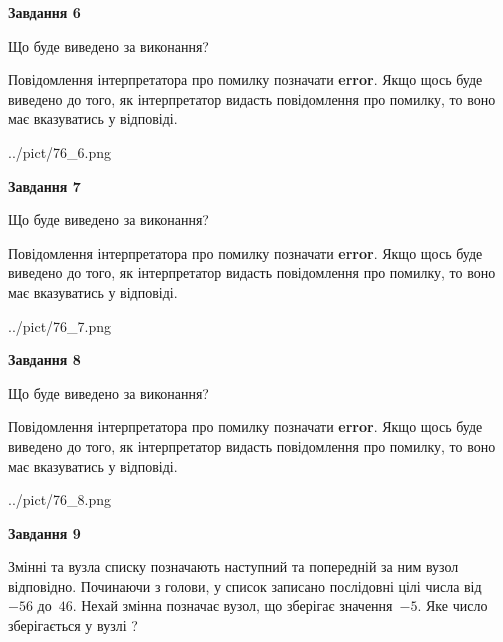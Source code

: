 \documentclass[12pt, ukrainian]{article}
\begin{document}
{\begin {large}
{\begin {center}\textbf{Завдання 6}\end {center}}\par
Що буде виведено за виконання?

Повідомлення інтерпретатора про помилку позначати \textbf{error}.
Якщо щось буде виведено до того, як інтерпретатор видасть повідомлення про помилку, 
то воно має вказуватись у відповіді. \par


\begin{center}
	{../pict/76_6.png}
\end{center}
\newpage

{\begin {center}\textbf{Завдання 7}\end {center}}\par
Що буде виведено за виконання?

Повідомлення інтерпретатора про помилку позначати \textbf{error}.
Якщо щось буде виведено до того, як інтерпретатор видасть повідомлення про помилку, 
то воно має вказуватись у відповіді. \par


\begin{center}
	{../pict/76_7.png}
\end{center}
\newpage

{\begin {center}\textbf{Завдання 8}\end {center}}\par
Що буде виведено за виконання?

Повідомлення інтерпретатора про помилку позначати \textbf{error}.
Якщо щось буде виведено до того, як інтерпретатор видасть повідомлення про помилку, 
то воно має вказуватись у відповіді. \par


\begin{center}
	{../pict/76_8.png}
\end{center}
\newpage

{\begin {center}\textbf{Завдання 9}\end {center}}\par
Змінні  та  вузла списку позначають наступний та попередній за ним вузол відповідно. Починаючи з голови, у список записано послідовні цілі числа від~$-56$ до~$46$. Нехай змінна  позначає вузол, що зберігає значення~$-5$.
Яке число зберігається у вузлі  ?\par
\newpage


\end{large}}
\end{document}
